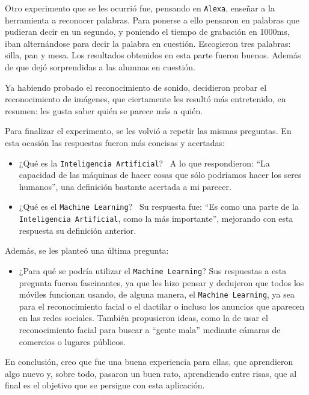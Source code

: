 \documentclass[a4paper, 12pt]{book}
\begin{document}
Otro experimento que se les ocurrió fue, pensando en \texttt{Alexa}, enseñar a la herramienta a reconocer palabras. Para ponerse a ello pensaron en palabras que pudieran decir en un segundo, y poniendo el tiempo de grabación en 1000ms, iban alternándose para decir la palabra en cuestión. Escogieron tres palabras: silla, pan y mesa. Los resultados obtenidos en esta parte fueron buenos. Además de que dejó sorprendidas a las alumnas en cuestión.

Ya habiendo probado el reconocimiento de sonido, decidieron probar el reconocimiento de imágenes, que ciertamente les resultó más entretenido, en resumen: les gusta saber quién se parece más a quién.

Para finalizar el experimento, se les volvió a repetir las mismas preguntas. En esta ocasión las respuestas fueron más concisas y acertadas:

\begin{itemize}
	\item ¿Qué es la \texttt{Inteligencia Artificial}?~ A lo que respondieron: ``La capacidad de las máquinas de hacer cosas que sólo podríamos hacer los seres humanos'', una definición bastante acertada a mi parecer.
	\item ¿Qué es el \texttt{Machine Learning}?~ Su respuesta fue: ``Es como una parte de la \texttt{Inteligencia Artificial}, como la más importante'', mejorando con esta respuesta su definición anterior.
\end{itemize}

Además, se les planteó una última pregunta:

\begin{itemize}
	\item ¿Para qué se podría utilizar el \texttt{Machine Learning}? Sus respuestas a esta pregunta fueron fascinantes, ya que les hizo pensar y dedujeron que todos los móviles funcionan usando, de alguna manera, el \texttt{Machine Learning}, ya sea para el reconocimiento facial o el dactilar o incluso los anuncios que aparecen en las redes sociales. También propusieron ideas, como la de usar el reconocimiento facial para buscar a ``gente mala'' mediante cámaras de comercios o lugares públicos.
\end{itemize}

En conclusión, creo que fue una buena experiencia para ellas, que aprendieron algo nuevo y, sobre todo, pasaron un buen rato, aprendiendo entre risas, que al final es el objetivo que se persigue con esta aplicación.

\end{document}

